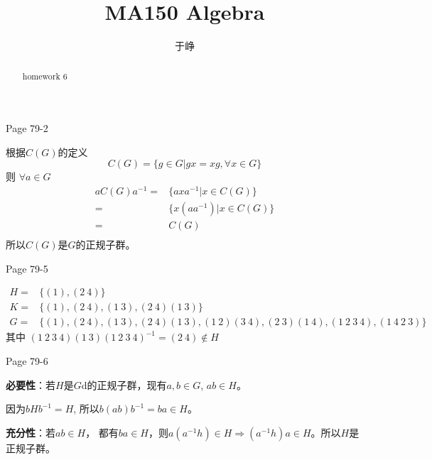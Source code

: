 \documentclass{ximera}
\title{MA150 Algebra}
\author{于峥}
\begin{document}
\begin{abstract}
    homework 6
\end{abstract}

\maketitle

\begin{problem} Page 79-2
    \begin{solution}
        根据$C(G)$的定义
        $$C(G)=\{g \in G | gx=xg, \forall x \in G\}$$
        则 $\forall a \in G$
        $$
        \begin{aligned}           
            aC(G)a^{-1} =& \{axa^{-1} | x \in C(G) \}  \\
            =& \{ x(aa^{-1}) | x \in C(G)\}  \\
            =& C(G) \\
        \end{aligned}
        $$
        所以$C(G)$是$G$的正规子群。
    \end{solution}
\end{problem}

\begin{problem} Page 79-5
    \begin{solution}
        $$
        \begin{aligned}
            H =& \{(1), (2\ 4)\} \\
            K =& \{(1), (2\ 4), (1\ 3), (2\ 4)(1\ 3)\} \\
            G =& \{(1), (2\ 4), (1\ 3), (2\ 4)(1\ 3), (1\ 2)(3\ 4), (2\ 3)(1\ 4), (1\ 2\ 3\ 4), (1\ 4\ 2\ 3)\}
        \end{aligned}
        $$
        其中
        $(1\ 2\ 3\ 4)(1\ 3)(1\ 2\ 3\ 4)^{-1} = (2\ 4) \not\in H$
    \end{solution}
\end{problem}

\newpage
\begin{problem} Page 79-6
    \begin{solution}
        \textbf{必要性}：若$H$是$G$d的正规子群，现有$a,b \in G$, $ab \in H$。
        
        因为$bHb^{-1} = H$, 所以$b(ab)b^{-1} = ba \in H$。

        \textbf{充分性}：若$ab \in H$， 都有$ba \in H$，则$a(a^{-1}h) \in H \Rightarrow (a^{-1}h)a \in H$。所以$H$是正规子群。
    \end{solution}
\end{problem}
\end{document}
